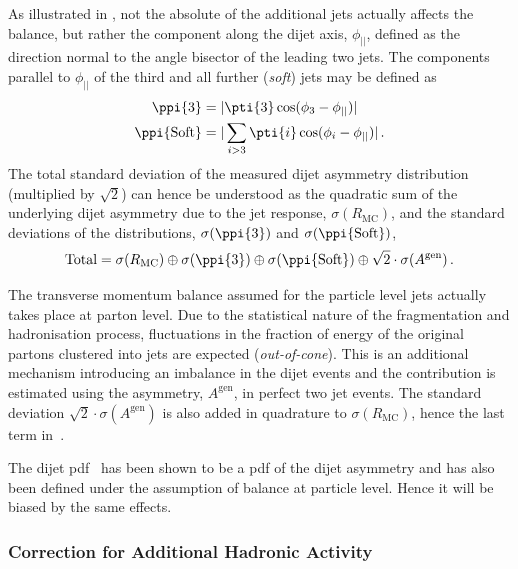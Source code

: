 As illustrated in , not the
absolute \pt of the additional jets actually affects the balance, but rather the component along the dijet axis, $\phi_{||}$, defined as the direction normal to the angle bisector of the leading two jets.
The \pt components parallel to $\phi_{||}$ of the third and all further
(\textit{soft}) jets may be defined as
\begin{align}
  \begin{split}
    \ppi{3}               & =  |\pti{3}\cos(\phi_{3}-\phi_{||})| \\
    \ppi{\text{Soft}} & =  |\sum_{i>3}\pti{i}\cos(\phi_{i}-\phi_{||})| \,.
  \end{split}
\end{align}
The total standard deviation of the measured dijet asymmetry
distribution (multiplied by $\sqrt{2}$) can hence be understood as the
quadratic sum of the underlying dijet asymmetry due to the jet \pt response,
$\sigma(R_{\text{MC}})$, and the standard deviations of the \pp
distributions, $\sigma(\ppi{3})$ and
$\sigma(\ppi{\text{Soft}})$,
\begin{equation}
  \label{eq:ResFit:TotalAsym}
  \text{Total} = \sigma(R_{\text{MC}}) \oplus \sigma(\ppi{3}) \oplus
  \sigma(\ppi{\text{Soft}}) \oplus \sqrt{2}\cdot\sigma(A^{\text{gen}}) \,.
\end{equation}

The transverse momentum balance assumed for the particle level jets
actually takes place at parton level.
Due to the statistical nature of the fragmentation and hadronisation
process, fluctuations in the
fraction of energy of the original partons clustered into jets are
expected (\textit{out-of-cone}).
This is an additional mechanism introducing an imbalance in the
dijet events and the contribution is estimated using the \ptgen
asymmetry, $A^{\text{gen}}$, in perfect
two jet events.
The standard deviation $\sqrt{2}\cdot\sigma(A^{\text{gen}})$ is also added in quadrature to
$\sigma(R_{\text{MC}})$, hence the last term in~.

The dijet pdf~ has been shown to be a pdf of
the dijet asymmetry and has also been defined under the assumption of \pt
balance at particle level.
Hence it will be biased by the same effects.



\subsubsection{Correction for Additional Hadronic Activity}\label{sec:ResFit:DataDriven:AddJets:Extrapolation}

